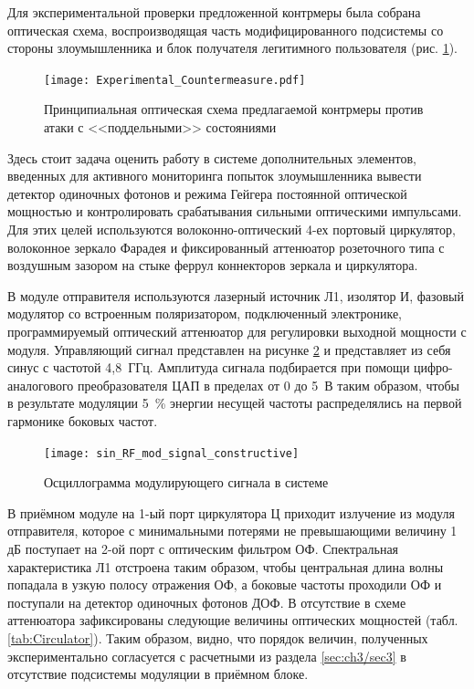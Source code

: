 Для экспериментальной проверки предложенной контрмеры была собрана оптическая схема, воспроизводящая часть модифицированного подсистемы со стороны злоумышленника и блок получателя легитимного пользователя (рис. \ref{fig:Experimental_countermeasure}). 


 \begin{figure}[ht]
  \centering
  \texttt{[image: Experimental\_Countermeasure.pdf]}
  \caption{Принципиальная оптическая схема предлагаемой контрмеры против атаки с <<поддельными>> состояниями}
  \label{fig:Experimental_countermeasure}
\end{figure}

Здесь стоит задача оценить работу в системе дополнительных элементов, введенных для активного мониторинга попыток злоумышленника вывести детектор одиночных фотонов и режима Гейгера постоянной оптической мощностью и контролировать срабатывания сильными оптическими импульсами. Для этих целей используются волоконно-оптический 4-ех портовый циркулятор, волоконное зеркало Фарадея и фиксированный аттенюатор розеточного типа с воздушным зазором на стыке феррул коннекторов зеркала и циркулятора. 

В модуле отправителя используются лазерный источник Л1, изолятор И, фазовый модулятор со встроенным поляризатором, подключенный электронике, программируемый оптический аттенюатор для регулировки выходной мощности с модуля. Управляющий сигнал представлен на рисунке \ref{fig:RF_sin} и представляет из себя синус с частотой 4,8~ГГц. Амплитуда сигнала подбирается при помощи цифро-аналогового преобразователя ЦАП в пределах от 0 до 5~В таким образом, чтобы в результате модуляции 5~\% энергии несущей частоты распределялись на первой гармонике боковых частот.    


 \begin{figure}[ht]
  \centering
  \texttt{[image: sin\_RF\_mod\_signal\_constructive]}
  \caption{Осциллограмма модулирующего сигнала в системе}
  \label{fig:RF_sin}
\end{figure}


В приёмном модуле на 1-ый порт циркулятора Ц приходит излучение из модуля отправителя, которое с минимальными потерями не превышающими величину 1 дБ поступает на 2-ой порт с оптическим фильтром ОФ. Спектральная характеристика Л1 отстроена таким образом, чтобы центральная длина волны попадала в узкую полосу отражения ОФ, а боковые частоты проходили ОФ и поступали на детектор одиночных фотонов ДОФ. В отсутствие в схеме аттенюатора зафиксированы следующие величины оптических мощностей (табл. \ref{tab:Circulator}). Таким образом, видно, что порядок величин, полученных экспериментально согласуется с расчетными из раздела \ref{sec:ch3/sec3} в отсутствие подсистемы модуляции в приёмном блоке. 


